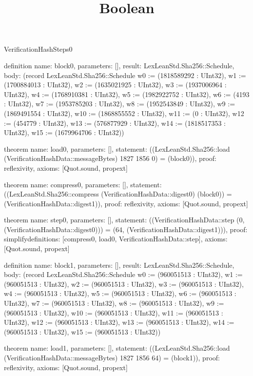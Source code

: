 \begin{lexlean}{VerificationHashSteps0}
\title{Boolean}
\begin{semanticmodule}

definition{
  name: block0,
  parameters: [],
  result: LexLeanStd.Sha256::Schedule,
  body: (record LexLeanStd.Sha256::Schedule {w0 := (1818589292 : UInt32), w1 := (1700884013 : UInt32), w2 := (1635021925 : UInt32), w3 := (1937006964 : UInt32), w4 := (1768910381 : UInt32), w5 := (1982922752 : UInt32), w6 := (4193 : UInt32), w7 := (1953785203 : UInt32), w8 := (1952543849 : UInt32), w9 := (1869491554 : UInt32), w10 := (1868855552 : UInt32), w11 := (0 : UInt32), w12 := (454779 : UInt32), w13 := (576877929 : UInt32), w14 := (1818517353 : UInt32), w15 := (1679964706 : UInt32)})
}

theorem{
  name: load0,
  parameters: [],
  statement: ((LexLeanStd.Sha256::load (VerificationHashData::messageBytes) 1827 1856 0) = (block0)),
  proof: reflexivity{},
  axioms: [Quot.sound, propext]
}

theorem{
  name: compress0,
  parameters: [],
  statement: ((LexLeanStd.Sha256::compress (VerificationHashData::digest0) (block0)) = (VerificationHashData::digest1)),
  proof: reflexivity{},
  axioms: [Quot.sound, propext]
}

theorem{
  name: step0,
  parameters: [],
  statement: ((VerificationHashData::step (0, (VerificationHashData::digest0))) = (64, (VerificationHashData::digest1))),
  proof: simplify{definitions: [compress0, load0, VerificationHashData::step]},
  axioms: [Quot.sound, propext]
}

definition{
  name: block1,
  parameters: [],
  result: LexLeanStd.Sha256::Schedule,
  body: (record LexLeanStd.Sha256::Schedule {w0 := (960051513 : UInt32), w1 := (960051513 : UInt32), w2 := (960051513 : UInt32), w3 := (960051513 : UInt32), w4 := (960051513 : UInt32), w5 := (960051513 : UInt32), w6 := (960051513 : UInt32), w7 := (960051513 : UInt32), w8 := (960051513 : UInt32), w9 := (960051513 : UInt32), w10 := (960051513 : UInt32), w11 := (960051513 : UInt32), w12 := (960051513 : UInt32), w13 := (960051513 : UInt32), w14 := (960051513 : UInt32), w15 := (960051513 : UInt32)})
}

theorem{
  name: load1,
  parameters: [],
  statement: ((LexLeanStd.Sha256::load (VerificationHashData::messageBytes) 1827 1856 64) = (block1)),
  proof: reflexivity{},
  axioms: [Quot.sound, propext]
}


\end{semanticmodule}
\end{lexlean}
